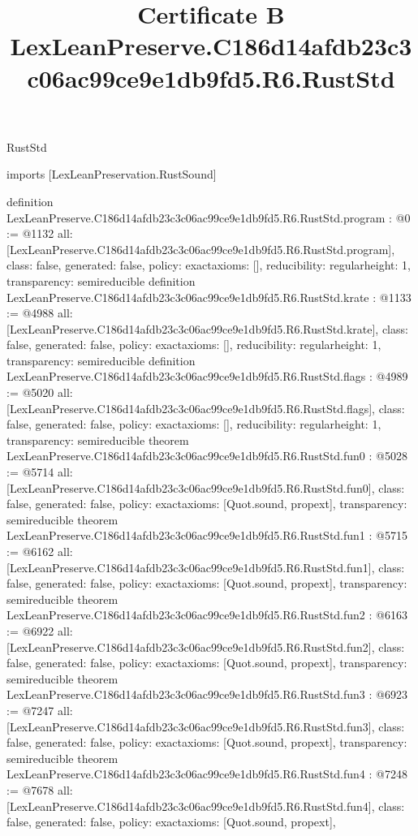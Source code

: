 \begin{lexlean}{RustStd}
\title{Certificate B LexLeanPreserve.C186d14afdb23c3c06ac99ce9e1db9fd5.R6.RustStd}
\begin{coremodule}
imports [LexLeanPreservation.RustSound]

definition LexLeanPreserve.C186d14afdb23c3c06ac99ce9e1db9fd5.R6.RustStd.program : @0 := @1132 {
  all: [LexLeanPreserve.C186d14afdb23c3c06ac99ce9e1db9fd5.R6.RustStd.program],
  class: false,
  generated: false,
  policy: exact{axioms: []},
  reducibility: regular{height: 1},
  transparency: semireducible
}
definition LexLeanPreserve.C186d14afdb23c3c06ac99ce9e1db9fd5.R6.RustStd.krate : @1133 := @4988 {
  all: [LexLeanPreserve.C186d14afdb23c3c06ac99ce9e1db9fd5.R6.RustStd.krate],
  class: false,
  generated: false,
  policy: exact{axioms: []},
  reducibility: regular{height: 1},
  transparency: semireducible
}
definition LexLeanPreserve.C186d14afdb23c3c06ac99ce9e1db9fd5.R6.RustStd.flags : @4989 := @5020 {
  all: [LexLeanPreserve.C186d14afdb23c3c06ac99ce9e1db9fd5.R6.RustStd.flags],
  class: false,
  generated: false,
  policy: exact{axioms: []},
  reducibility: regular{height: 1},
  transparency: semireducible
}
theorem LexLeanPreserve.C186d14afdb23c3c06ac99ce9e1db9fd5.R6.RustStd.fun0 : @5028 := @5714 {
  all: [LexLeanPreserve.C186d14afdb23c3c06ac99ce9e1db9fd5.R6.RustStd.fun0],
  class: false,
  generated: false,
  policy: exact{axioms: [Quot.sound, propext]},
  transparency: semireducible
}
theorem LexLeanPreserve.C186d14afdb23c3c06ac99ce9e1db9fd5.R6.RustStd.fun1 : @5715 := @6162 {
  all: [LexLeanPreserve.C186d14afdb23c3c06ac99ce9e1db9fd5.R6.RustStd.fun1],
  class: false,
  generated: false,
  policy: exact{axioms: [Quot.sound, propext]},
  transparency: semireducible
}
theorem LexLeanPreserve.C186d14afdb23c3c06ac99ce9e1db9fd5.R6.RustStd.fun2 : @6163 := @6922 {
  all: [LexLeanPreserve.C186d14afdb23c3c06ac99ce9e1db9fd5.R6.RustStd.fun2],
  class: false,
  generated: false,
  policy: exact{axioms: [Quot.sound, propext]},
  transparency: semireducible
}
theorem LexLeanPreserve.C186d14afdb23c3c06ac99ce9e1db9fd5.R6.RustStd.fun3 : @6923 := @7247 {
  all: [LexLeanPreserve.C186d14afdb23c3c06ac99ce9e1db9fd5.R6.RustStd.fun3],
  class: false,
  generated: false,
  policy: exact{axioms: [Quot.sound, propext]},
  transparency: semireducible
}
theorem LexLeanPreserve.C186d14afdb23c3c06ac99ce9e1db9fd5.R6.RustStd.fun4 : @7248 := @7678 {
  all: [LexLeanPreserve.C186d14afdb23c3c06ac99ce9e1db9fd5.R6.RustStd.fun4],
  class: false,
  generated: false,
  policy: exact{axioms: [Quot.sound, propext]},
}
\end{coremodule}
\end{lexlean}
